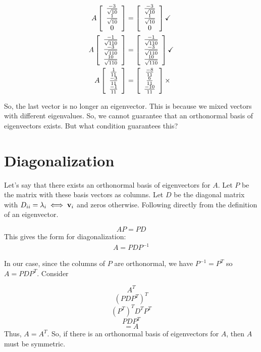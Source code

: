 \documentclass{article}
\begin{document}
    \begin{align}
        A\left[\begin{array}{c}\frac{-3}{\sqrt{10}} \\ \frac{1}{\sqrt{10}} \\ 0\end{array}\right] &= \left[\begin{array}{c}\frac{-3}{\sqrt{10}} \\ \frac{1}{\sqrt{10}} \\ 0\end{array}\right]\checkmark 
        \\
        A\left[\begin{array}{c}\frac{-1}{\sqrt{110}} \\ \frac{-3}{\sqrt{110}} \\\frac{10}{\sqrt{110}}\end{array}\right] &= \left[\begin{array}{c}\frac{-1}{\sqrt{110}} \\ \frac{-3}{\sqrt{110}} \\\frac{10}{\sqrt{110}}\end{array}\right] 
        \checkmark
        \\
        A\left[\begin{array}{c}\frac{1}{11} \\ \frac{-3}{11} \\ \frac{-1}{11}\end{array}\right] &= \left[\begin{array}{c}\frac{-8}{11} \\ \frac{6}{11} \\ \frac{-10}{11}\end{array}\right] \times
    \end{align}

    So, the last vector is no longer an eigenvector. This is because we mixed vectors with different eigenvalues. So, we cannot guarantee that an orthonormal basis of eigenvectors exists. But what condition guarantees this?
    
    \section{Diagonalization}

    Let's say that there exists an orthonormal basis of eigenvectors for $A$. Let $P$ be the matrix with these basis vectors as columns. Let $D$ be the diagonal matrix with $D_{ii} = \lambda_i \iff \mathbf{v}_i$ and zeros otherwise. Following directly from the definition of an eigenvector.

    \[AP = PD\]
    This gives the form for diagonalization:
    \begin{align}
        A = PDP^{-1}
    \end{align}

    In our case, since the columns of $P$ are orthonormal, we have $P^{-1} = P^T$ so $A = PDP^T$. Consider

    \[A^T\]
    \[(PDP^T)^T\]
    \[(P^T)^T D^T P^T\]
    \[PDP^T\]
    \[=A\]
    Thus, $A = A^T$. So, if there is an orthonormal basis of eigenvectors for $A$, then $A$ must be symmetric.



   
\end{document}
